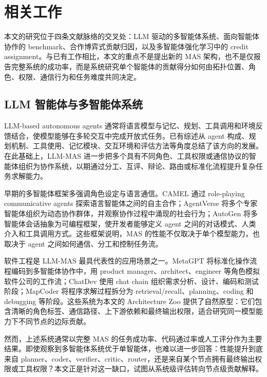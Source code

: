 \section{相关工作}
\label{sec:related_work}

本文的研究位于四条文献脉络的交叉处：LLM 驱动的多智能体系统、面向智能体协作的 benchmark、合作博弈式贡献归因，以及多智能体强化学习中的 credit assignment。与已有工作相比，本文的重点不是提出新的 MAS 架构，也不是仅报告完整系统的成功率，而是系统研究单个智能体的贡献得分如何由拓扑位置、角色、权限、通信行为和任务难度共同决定。

\subsection{LLM 智能体与多智能体系统}

LLM-based autonomous agents 通常将语言模型与记忆、规划、工具调用和环境反馈结合，使模型能够在多轮交互中完成开放式任务。已有综述从 agent 构成、规划机制、工具使用、记忆模块、交互环境和评估方法等角度总结了该方向的发展\cite{wang2024survey_agents,guo2024llm_ma_survey,chen2024llm_mas_survey}。在此基础上，LLM-MAS 进一步把多个具有不同角色、工具权限或通信协议的智能体组织为协作系统，以期通过分工、互评、辩论、路由或标准化流程提升复杂任务求解能力。

早期的多智能体框架多强调角色设定与语言通信。CAMEL 通过 role-playing communicative agents 探索语言智能体之间的自主合作\cite{li2023camel}；AgentVerse 将多个专家智能体组织为动态协作群体，并观察协作过程中涌现的社会行为\cite{chen2023agentverse}；AutoGen 将多智能体会话抽象为可编程框架，使开发者能够定义 agent 之间的对话模式、人类介入和工具调用方式\cite{wu2023autogen}。这些框架说明，MAS 的性能不仅取决于单个模型能力，也取决于 agent 之间如何通信、分工和控制任务流。

软件工程是 LLM-MAS 最具代表性的应用场景之一。MetaGPT 将标准化操作流程编码到多智能体协作中，用 product manager、architect、engineer 等角色模拟软件公司的工作流\cite{hong2023metagpt}；ChatDev 使用 chat chain 组织需求分析、设计、编码和测试阶段\cite{qian2023chatdev}；MapCoder 将程序求解过程拆分为 retrieval/recall、planning、coding 和 debugging 等阶段\cite{islam2024mapcoder}。这些系统为本文的 Architecture Zoo 提供了自然原型：它们包含清晰的角色标签、通信路径、上下游依赖和最终输出权限，适合研究同一模型能力下不同节点的边际贡献。

然而，上述系统通常以完整 MAS 的任务成功率、代码通过率或人工评分作为主要结果。即使观察到多智能体系统优于单智能体，也难以进一步回答：性能提升到底来自 planner、coder、verifier、critic、router，还是来自某个节点拥有最终输出权限或工具权限？本文正是针对这一缺口，试图从系统级评估转向节点级贡献解释。

